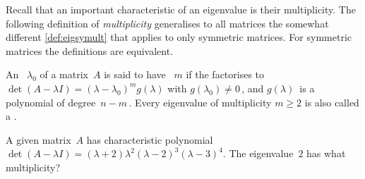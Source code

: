 Recall that an important characteristic of an eigenvalue is their multiplicity.
The following definition of \emph{multiplicity} generalises to all matrices the somewhat different \autoref{def:eigsymult} that applies to only symmetric matrices.
For symmetric matrices the definitions are equivalent.


\begin{definition} \label{def:eigmult}
An ~\(\lambda_0\) of a matrix~\(A\) is said to have ~\(m\) if the  factorises to \(\det(A-\lambda I)=(\lambda-\lambda_0)^mg(\lambda)\) with \(g(\lambda_0)\neq0\)\,, and \(g(\lambda)\)~is a polynomial of degree~\(n-m\)\,.
Every eigenvalue of multiplicity \(m\geq2\) is also called a .
\end{definition}



\begin{activity}
A given matrix~\(A\) has characteristic polynomial \(\det(A-\lambda I)=(\lambda+2)\lambda^2(\lambda-2)^3(\lambda-3)^4\).
The eigenvalue~\(2\) has what multiplicity?
\end{activity}



